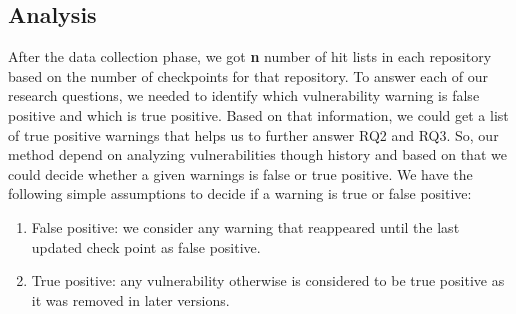 


\subsection{Analysis}
After the data collection phase, we got \textbf{n} number of hit lists in each repository based on the number of checkpoints for that repository. To answer each of our research questions, we needed to identify which vulnerability warning is false positive and which is true positive. Based on that information, we could get a list of true positive warnings that helps us to further answer RQ2 and RQ3. So, our method depend on analyzing vulnerabilities though history and based on that we could decide whether a given warnings is false or true positive. We have the following simple assumptions to decide if a warning is true or false positive:
\begin{enumerate}
\item False positive: we consider any warning that reappeared until the last updated check point as false positive. 
\item True positive: any vulnerability otherwise is considered to be true positive as it was removed in later versions. 
\end{enumerate}
